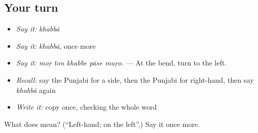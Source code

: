 \subsection*{Your turn}
\begin{itemize}
\raggedright
  \item \emph{Say it:} \emph{khabbā}
  \item \emph{Say it:} \emph{khabbā}, once more
  \item \emph{Say it:} \emph{moṛ ton khabbe pāse muṛo.} — At the bend, turn to the left.
  \item \emph{Recall:} say the Punjabi for a side, then the Punjabi for right-hand, then say \emph{khabbā} again
  \item \emph{Write it:} copy \textbf{} once, checking the whole word
\end{itemize}

\begin{tcolorbox}[breakable,colback=teal!4,colframe=teal!35!black,title={Before you move on}]
What does  mean? (\textquotedblleft{}Left-hand; on the left\textquotedblright{}.) Say it once more.
\end{tcolorbox}
